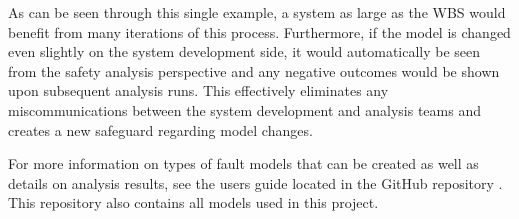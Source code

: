 As can be seen through this single example, a system as large as the WBS would benefit from many iterations of this process. Furthermore, if the model is changed even slightly on the system development side, it would automatically be seen from the safety analysis perspective and any negative outcomes would be shown upon subsequent analysis runs. This effectively eliminates any miscommunications between the system development and analysis teams and creates a new safeguard regarding model changes. 

For more information on types of fault models that can be created as well as details on analysis results, see the users guide located in the GitHub repository \cite{SAGithub}. This repository also contains all models used in this project. 